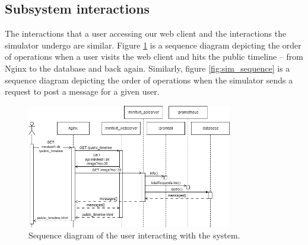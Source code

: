 
\subsection{Subsystem interactions}


The interactions that a user accessing our web client and the interactions the simulator undergo are similar. 
Figure \ref{fig:user_sequence} is a sequence diagram depicting the order of operations when a user visits the web client and hits the public timeline -- from Nginx to the database and back again. 
Similarly, figure \ref{fig:sim_sequence} is a sequence diagram depicting the order of operations when the simulator sends a request to post a message for a given user.



\begin{figure}[H]
    \centering
    \includegraphics[width=0.8\textwidth]{images/sequence.png}
    \caption{Sequence diagram of the user interacting with the system.}
    \label{fig:user_sequence}
\end{figure}

